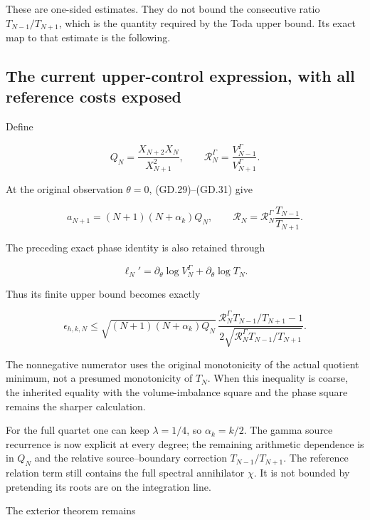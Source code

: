 These are one-sided estimates. They do not bound the consecutive ratio
\(T_{N-1}/T_{N+1}\), which is the quantity required by the Toda upper
bound. Its exact map to that estimate is the following.

\subsection[\hspace{0.4em}The current upper-control expression, with all reference
costs
exposed]{The current upper-control expression, with all reference
costs
exposed}\label{gammad-the-current-upper-control-expression-with-all-reference-costs-exposed}

Define

\[
Q_N=\frac{X_{N+2}X_N}{X_{N+1}^2},\qquad
\mathcal R_N^\Gamma=\frac{V_{N-1}^\Gamma}{V_{N+1}^\Gamma}.
\]

At the original observation \(\theta=0\), (GD.29)--(GD.31) give

\[
\boxed{
a_{N+1}=(N+1)(N+\alpha_k)Q_N,\qquad
\mathcal R_N=\mathcal R_N^\Gamma\frac{T_{N-1}}{T_{N+1}}.
}                                                                   \tag{GD.34}
\]

The preceding exact phase identity is also retained through

\[
\ell_N'=\partial_\theta\log V_N^\Gamma+\partial_\theta\log T_N.
\]

Thus its finite upper bound becomes exactly

\[
\boxed{
\epsilon_{h,k,N}\le
\sqrt{(N+1)(N+\alpha_k)Q_N}\,
\frac{\mathcal R_N^\Gamma T_{N-1}/T_{N+1}-1}
 {2\sqrt{\mathcal R_N^\Gamma T_{N-1}/T_{N+1}}}.
}                                                                   \tag{GD.35}
\]

The nonnegative numerator uses the original monotonicity of the actual
quotient minimum, not a presumed monotonicity of \(T_N\). When this
inequality is coarse, the inherited equality with the volume-imbalance
square and the phase square remains the sharper calculation.

For the full quartet one can keep \(\lambda=1/4\), so \(\alpha_k=k/2\).
The gamma source recurrence is now explicit at every degree; the
remaining arithmetic dependence is in \(Q_N\) and the relative
source--boundary correction \(T_{N-1}/T_{N+1}\). The reference relation
term still contains the full spectral annihilator \(\chi\). It is not
bounded by pretending its roots are on the integration line.

The exterior theorem remains


